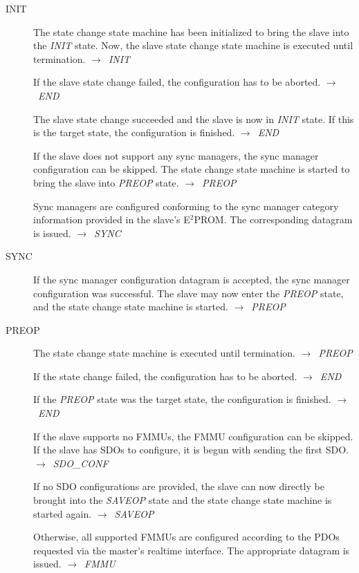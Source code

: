 \documentclass[a4paper,12pt,BCOR6mm,bibtotoc,idxtotoc]{scrbook}
\begin{document}
\begin{description}
\item[INIT] The state change state machine has been initialized to
  bring the slave into the \textit{INIT} state. Now, the slave state
  change state machine is executed until termination.
  $\rightarrow$~\textit{INIT}

  If the slave state change failed, the configuration has to be
  aborted. $\rightarrow$~\textit{END}

  The slave state change succeeded and the slave is now in
  \textit{INIT} state. If this is the target state, the configuration
  is finished. $\rightarrow$~\textit{END}

  If the slave does not support any sync managers, the sync manager
  configuration can be skipped. The state change state machine is
  started to bring the slave into \textit{PREOP} state.
  $\rightarrow$~\textit{PREOP}

  Sync managers are configured conforming to the sync manager category
  information provided in the slave's E$^2$PROM. The corresponding
  datagram is issued. $\rightarrow$~\textit{SYNC}

\item[SYNC] If the sync manager configuration datagram is accepted,
  the sync manager configuration was successful. The slave may now
  enter the \textit{PREOP} state, and the state change state machine
  is started. $\rightarrow$~\textit{PREOP}

\item[PREOP] The state change state machine is executed until
  termination. $\rightarrow$~\textit{PREOP}

  If the state change failed, the configuration has to be aborted.
  $\rightarrow$~\textit{END}

  If the \textit{PREOP} state was the target state, the configuration
  is finished. $\rightarrow$~\textit{END}

  If the slave supports no FMMUs, the FMMU configuration can be
  skipped. If the slave has SDOs to configure, it is begun with
  sending the first SDO. $\rightarrow$~\textit{SDO\_CONF}

  If no SDO configurations are provided, the slave can now directly be
  brought into the \textit{SAVEOP} state and the state change state
  machine is started again. $\rightarrow$~\textit{SAVEOP}

  Otherwise, all supported FMMUs are configured according to the PDOs
  requested via the master's realtime interface. The appropriate
  datagram is issued. $\rightarrow$~\textit{FMMU}


\end{description}
\end{document}
